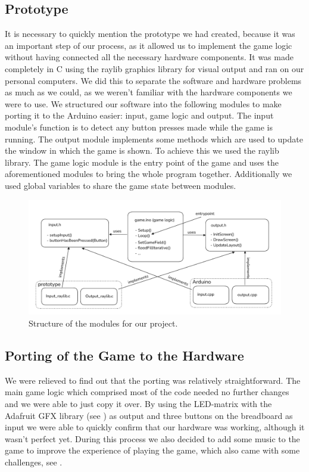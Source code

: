 \documentclass[10pt, a4paper]{article}
\begin{document}
\subsection*{Prototype}

It is necessary to quickly mention the prototype we had created, because it was an important step of our process, as it allowed us to implement the game logic without having connected all the necessary hardware components. It was made completely in C using the raylib graphics library for visual output and ran on our personal computers. We did this to separate the software and hardware problems as much as we could, as we weren't familiar with the hardware components we were to use. We structured our software into the following modules to make porting it to the Arduino easier: input, game logic and output. The input module's function is to detect any button presses made while the game is running. The output module implements some methods which are used to update the window in which the game is shown. To achieve this we used the raylib library. The game logic module is the entry point of the game and uses the aforementioned modules to bring the whole program together. Additionally we used global variables to share the game state between modules.

\begin{figure}[h]
\centering
\includegraphics[width=\textwidth]{module_structure.png}
\caption{Structure of the modules for our project.}
\end{figure}


\subsection*{Porting of the Game to the Hardware}
We were relieved to find out that the porting was relatively straightforward. The main game logic which comprised most of the code needed no further changes and we were able to just copy it over. By using the LED-matrix with the Adafruit GFX library (see ) as output and three buttons on the breadboard as input we were able to quickly confirm that our hardware was working, although it wasn't perfect yet. During this process we also decided to add some music to the game to improve the experience of playing the game, which also came with some challenges, see .
\end{document}
